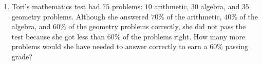 \documentclass{article}
\begin{document}
\begin{multicols}{2}
\begin{enumerate}
\begin{center}
            \end{center}
            \vspace{3cm}
        \item Tori's mathematics test had $75$ problems: $10$ arithmetic, $30$ algebra, and $35$ geometry problems.
            Although she answered $70\%$ of the arithmetic, $40\%$ of the algebra, and $60\%$ of the geometry problems correctly, she did not pass the test because she got less than $60\%$ of the problems right.
            How many more problems would she have needed to answer correctly to earn a $60\%$ passing grade?
            \vspace{3cm}
    \end{enumerate}
\end{multicols}
\end{document}
